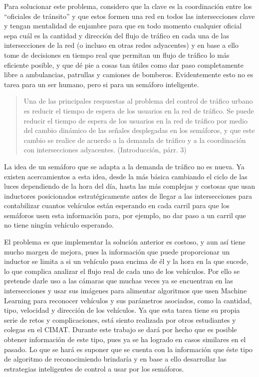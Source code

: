 Para solucionar este problema, considero que la clave es la coordinación
entre los ``oficiales de tránsito'' y que estos formen una red en todos
las intersecciones clave y tengan mentalidad de enjambre para que en
todo momento cualquier oficial sepa cuál es la cantidad y dirección del
flujo de tráfico en cada una de las intersecciones de la red (o incluso
en otras redes adyacentes) y en base a ello tome de decisiones en tiempo
real que permitan un flujo de tráfico lo más eficiente posible, y que dé
pie a cosas tan útiles como dar paso completamente libre a ambulancias,
patrullas y camiones de bomberos. Evidentemente esto no es tarea para un
ser humano, pero si para un semáforo inteligente.

\begin{quote}
Una de las principales respuestas al problema del control de tráfico
urbano es reducir el tiempo de espera de los usuarios en la red de
tráfico. Se puede reducir el tiempo de espera de los usuarios en la red
de tráfico por medio del cambio dinámico de las señales desplegadas en
los semáforos, y que este cambio se realice de acuerdo a la demanda de
tráfico y a la coordinación con intersecciones adyacentes.
(Introducción, párr. 3)
\end{quote}

La idea de un semáforo que se adapta a la demanda de tráfico no es
nueva. Ya existen acercamientos a esta idea, desde la más básica
cambiando el ciclo de las luces dependiendo de la hora del día, hasta
las más complejas y costosas que usan inductores posicionados
estratégicamente antes de llegar a las intersecciones para contabilizar
cuantos vehículos están esperando en cada carril para que los semáforos
usen esta información para, por ejemplo, no dar paso a un carril que no
tiene ningún vehículo esperando.

El problema es que implementar la solución anterior es costoso, y aun
así tiene mucho margen de mejora, pues la información que puede
proporcionar un inductor se limita a si un vehículo pasa encima de él y
la hora en la que sucede, lo que complica analizar el flujo real de cada
uno de los vehículos. Por ello se pretende darle uso a las cámaras que
muchas veces ya se encuentran en las intersecciones y usar sus imágenes
para alimentar algoritmos que usen Machine Learning para reconocer
vehículos y sus parámetros asociados, como la cantidad, tipo, velocidad
y dirección de los vehículos. Ya que esta tarea tiene su propia serie de
retos y complicaciones, está siento realizada por otros estudiantes y
colegas en el CIMAT. Durante este trabajo se dará por hecho que es
posible obtener información de este tipo, pues ya se ha logrado en casos
similares en el pasado. Lo que se hará es suponer que se cuenta con la
información que éste tipo de algoritmo de reconocimiendo brindaría y en
base a ello desarrollar las estrategias inteligentes de control a usar
por los semáforos.

